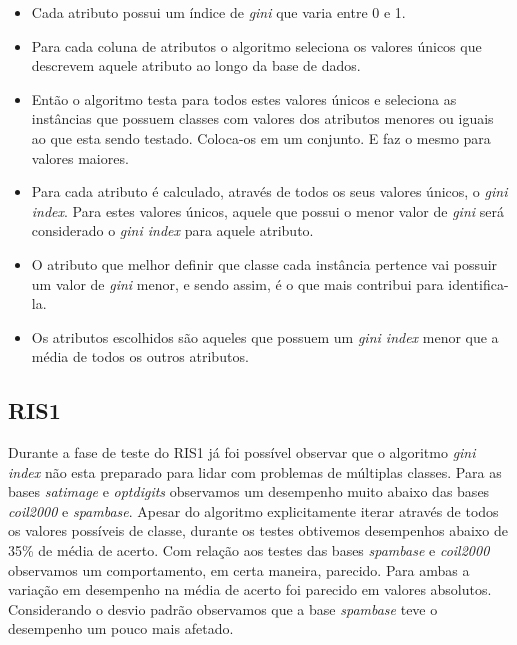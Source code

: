 \documentclass[a4paper, 12pt]{article}
\begin{document}
\begin{itemize}
	\item Cada atributo possui um índice de \textit{gini} que varia entre 0 e 1.
	\item Para cada coluna de atributos o algoritmo seleciona os valores únicos que descrevem aquele atributo ao longo da base de dados.
	\item Então o algoritmo testa para todos estes valores únicos e seleciona as instâncias que possuem classes com valores dos atributos menores ou iguais ao que esta sendo testado. Coloca-os em um conjunto. E faz o mesmo para valores maiores.
	\item Para cada atributo é calculado, através de todos os seus valores únicos, o \textit{gini index}. Para estes valores únicos, aquele que possui o menor valor de \textit{gini} será considerado o \textit{gini index} para aquele atributo.
	\item O atributo que melhor definir que classe cada instância pertence vai possuir um valor de \textit{gini} menor, e sendo assim, é o que mais contribui para identifica-la.
	\item Os atributos escolhidos são aqueles que possuem um \textit{gini index} menor que a média de todos os outros atributos.
\end{itemize}

\subsection{RIS1}
Durante a fase de teste do RIS1 já foi possível observar que o algoritmo \textit{gini index} não esta preparado para lidar com problemas de múltiplas classes. Para as bases \textit{satimage} e \textit{optdigits} observamos um desempenho muito abaixo das bases \textit{coil2000} e \textit{spambase}. Apesar do algoritmo explicitamente iterar através de todos os valores possíveis de classe, durante os testes obtivemos desempenhos abaixo de 35\% de média de acerto.
\newline
\indent Com relação aos testes das bases \textit{spambase} e \textit{coil2000} observamos um comportamento, em certa maneira, parecido. Para ambas a variação em desempenho na média de acerto foi parecido em valores absolutos. Considerando o desvio padrão observamos que a base \textit{spambase} teve o desempenho um pouco mais afetado.
\newline
\end{document}
